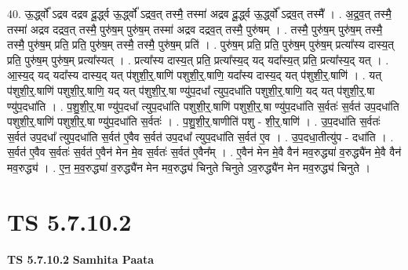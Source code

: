 \documentclass[17pt]{extarticle}
\begin{document}
40. ऊ॒र्द्ध्वो᳚ ऽद्रव दद्रव दू॒र्द्ध्व ऊ॒र्द्ध्वो᳚ ऽद्रव॒त् तस्मै॒ तस्मा॑ अद्रव दू॒र्द्ध्व ऊ॒र्द्ध्वो᳚ ऽद्रव॒त् तस्मै᳚ । . अ॒द्र॒व॒त् तस्मै॒ तस्मा॑ अद्रव दद्रव॒त् तस्मै॒ पुरु॑ष॒म् पुरु॑ष॒म् तस्मा॑ अद्रव दद्रव॒त् तस्मै॒ पुरु॑षम् । . तस्मै॒ पुरु॑ष॒म् पुरु॑ष॒म् तस्मै॒ तस्मै॒ पुरु॑ष॒म् प्रति॒ प्रति॒ पुरु॑ष॒म् तस्मै॒ तस्मै॒ पुरु॑ष॒म् प्रति॑ । . पुरु॑ष॒म् प्रति॒ प्रति॒ पुरु॑ष॒म् पुरु॑ष॒म् प्रत्या᳚स्य दास्य॒त् प्रति॒ पुरु॑ष॒म् पुरु॑ष॒म् प्रत्या᳚स्यत् । . प्रत्या᳚स्य दास्य॒त् प्रति॒ प्रत्या᳚स्य॒द् यद् यदा᳚स्य॒त् प्रति॒ प्रत्या᳚स्य॒द् यत् । . आ॒स्य॒द् यद् यदा᳚स्य दास्य॒द् यत् प॑शुशी॒र्॒.षाणि॑ पशुशी॒र्॒.षाणि॒ यदा᳚स्य दास्य॒द् यत् प॑शुशी॒र्॒.षाणि॑ । . यत् प॑शुशी॒र्॒.षाणि॑ पशुशी॒र्॒.षाणि॒ यद् यत् प॑शुशी॒र्॒.षा ण्यु॑प॒दधा᳚ त्युप॒दधा॑ति पशुशी॒र्॒.षाणि॒ यद् यत् प॑शुशी॒र्॒.षा ण्यु॑प॒दधा॑ति । . प॒शु॒शी॒र्॒.षा ण्यु॑प॒दधा᳚ त्युप॒दधा॑ति पशुशी॒र्॒.षाणि॑ पशुशी॒र्॒.षा ण्यु॑प॒दधा॑ति स॒र्वतः॑ स॒र्वत॑ उप॒दधा॑ति पशुशी॒र्॒.षाणि॑ पशुशी॒र्॒.षा ण्यु॑प॒दधा॑ति स॒र्वतः॑ । . प॒शु॒शी॒र्॒.षाणीति॑ पशु - शी॒र्॒.षाणि॑ । . उ॒प॒दधा॑ति स॒र्वतः॑ स॒र्वत॑ उप॒दधा᳚ त्युप॒दधा॑ति स॒र्वत॑ ए॒वैव स॒र्वत॑ उप॒दधा᳚ त्युप॒दधा॑ति स॒र्वत॑ ए॒व । . उ॒प॒दधा॒तीत्यु॑प - दधा॑ति । . स॒र्वत॑ ए॒वैव स॒र्वतः॑ स॒र्वत॑ ए॒वैन॑ मेन मे॒व स॒र्वतः॑ स॒र्वत॑ ए॒वैन᳚म् । . ए॒वैन॑ मेन मे॒वै वैन॑ मव॒रुद्ध्या॑ व॒रुद्ध्यै॑न मे॒वै वैन॑ मव॒रुद्ध्य॑ । . ए॒न॒ म॒व॒रुद्ध्या॑ व॒रुद्ध्यै॑न मेन मव॒रुद्ध्य॑ चिनुते चिनुते ऽव॒रुद्ध्यै॑न मेन मव॒रुद्ध्य॑ चिनुते । \newline
\pagebreak
{}

\section{ TS 5.7.10.2 }

\textbf{TS 5.7.10.2 } \newline
\textbf{Samhita Paata} \newline
\end{document}

